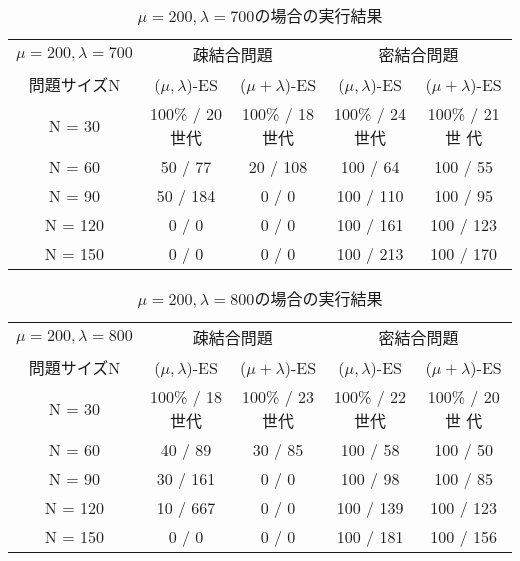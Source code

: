 \documentclass[a4j]{jarticle}
\begin{document}
\begin{table}[htb]
 \begin{center}
  \begin{tabular}[tb]{|c||c|c||c|c|} \hline
   $\mu = 200, \lambda = 700$& \multicolumn{2}{c||}{疎結合問題} &
   \multicolumn{2}{c|}{密結合問題} \\ \cline{2-5}
   問題サイズN& ($\mu, \lambda$)-ES& ($\mu + \lambda$)-ES& ($\mu, \lambda$)-ES&
   ($\mu + \lambda$)-ES \\ \hline \hline
   N = 30& 100\% / 20世代& 100\% / 18世代& 100\% / 24世代& 100\% / 21世
   代\\ \hline
   N = 60& 50 / 77&20 / 108 & 100 / 64& 100 / 55\\ \hline
   N = 90& 50 / 184&0 / 0 & 100 / 110& 100 / 95\\ \hline
   N = 120& 0 / 0&0 / 0 & 100 / 161& 100 / 123\\ \hline
   N = 150& 0 / 0&0 / 0 & 100 / 213& 100 / 170\\ \hline
  \end{tabular}
  \caption{$\mu = 200, \lambda = 700$の場合の実行結果}
  \label{27}
 \end{center}
\end{table}

\begin{table}[htb]
 \begin{center}
  \begin{tabular}[tb]{|c||c|c||c|c|} \hline
   $\mu = 200, \lambda = 800$& \multicolumn{2}{c||}{疎結合問題} &
   \multicolumn{2}{c|}{密結合問題} \\ \cline{2-5}
   問題サイズN& ($\mu, \lambda$)-ES& ($\mu + \lambda$)-ES& ($\mu, \lambda$)-ES&
   ($\mu + \lambda$)-ES \\ \hline \hline
   N = 30& 100\% / 18世代& 100\% / 23世代& 100\% / 22世代& 100\% / 20世
   代\\ \hline
   N = 60& 40 / 89& 30 / 85& 100 / 58& 100 / 50\\ \hline
   N = 90& 30 / 161& 0 / 0& 100 / 98& 100 / 85\\ \hline
   N = 120& 10 / 667& 0 / 0& 100 / 139& 100 / 123\\ \hline
   N = 150& 0 / 0& 0 / 0& 100 / 181& 100 / 156\\ \hline
  \end{tabular}
  \caption{$\mu = 200, \lambda = 800$の場合の実行結果}
  \label{28}
 \end{center}
\end{table}
\end{document}
